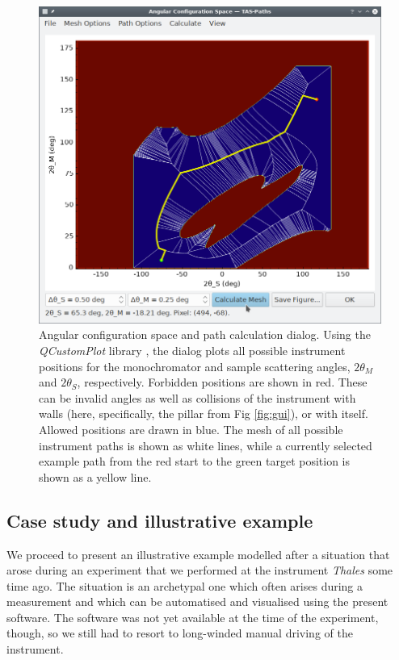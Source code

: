 \begin{figure}[htb]
		\begin{center}
			\includegraphics[width = 0.75 \textwidth]{figures/gui_configspace}
		\end{center}
	\caption[Configuration space dialog.]{Angular configuration space and path calculation dialog.
	Using the \textit{QCustomPlot} library \cite{web_QCustomPlot}, the dialog plots all possible
	instrument positions for the monochromator and sample scattering angles, $2\theta_M$ and $2\theta_S$, respectively.
	Forbidden positions are shown in red.
	These can be invalid angles as well as collisions of the instrument with walls
	(here, specifically, the pillar from Fig \ref{fig:gui}), or with itself.
	Allowed positions are drawn in blue. The mesh of all possible instrument
	paths is shown as white lines, while a currently selected example path from
	the red start to the green target position is shown as a yellow line.
		\label{fig:gui_configspace}}
\end{figure}


\subsection{Case study and illustrative example}
We proceed to present an illustrative example modelled after a situation that arose during an 
experiment that we performed at the instrument \textit{Thales} \cite{thales} some time ago. 
The situation is an archetypal one which often arises during a measurement and which
can be automatised and visualised using the present software.
The software was not yet available at the time of the experiment, though, so we still had to resort 
to long-winded manual driving of the instrument.

